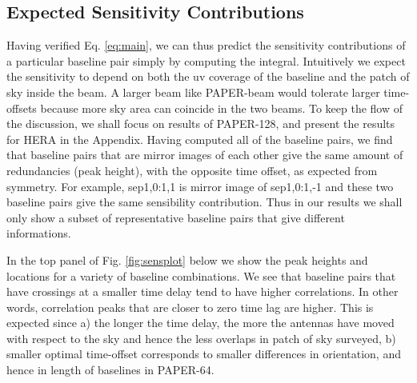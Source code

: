 \documentclass[preprint2,numberedappendix,tighten,twocolappendix]{aastex6}  %
\renewcommand\[{\begin{equation}}
\renewcommand\]{\end{equation}}
\begin{document}
\subsection{Expected Sensitivity Contributions}

Having verified Eq. \eqref{eq:main}, we can thus predict the sensitivity contributions of a
particular baseline pair simply by computing the integral.
Intuitively we expect the sensitivity to depend on both the uv coverage of the baseline and the patch of sky inside the beam. A larger beam like PAPER-beam would tolerate larger time-offsets because more sky area can coincide in the two beams. To keep the flow of the discussion, we shall focus on results of PAPER-128, and present the results for HERA in the Appendix. 
Having computed all of the baseline pairs, we find that baseline pairs that are mirror images of each other 
give the same amount of redundancies (peak height), with the opposite time offset, as expected from symmetry. 
For example, sep1,0:1,1 is mirror image of sep1,0:1,-1 and these two baseline pairs
give the same sensibility contribution. Thus in our results we shall only show a subset of representative baseline pairs 
that give different informations. 

In the top panel of Fig. \eqref{fig:sensplot} below
we show the peak heights and locations for a variety of baseline combinations.
We see that baseline pairs that have crossings at a smaller time delay
tend to have higher correlations. In other words, correlation peaks
that are closer to zero time lag are higher. This is expected since
a) the longer the time delay, the more the antennas have moved with respect
to the sky and hence the less overlaps in patch of sky surveyed, b) smaller optimal
time-offset corresponds to smaller differences in orientation, and hence in length of
baselines in PAPER-64. 
\end{document}
